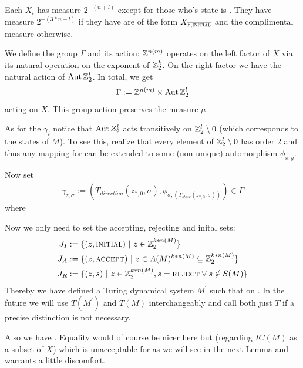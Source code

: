 \remark Each $X_i$ has measure $2^{-(n+l)}$ except for those who's state is \INI. They have measure $2^{-(3*n+l)}$ if they have are of the form $X_{\overline{z,\text{\scshape{initial}}}}$ and the complimental measure otherwise.

We define the group $\Gamma$ and its action:
$\mathbb{Z}^{n(m)}$ operates on the left factor of $X$ via its natural operation on the exponent of $\mathbb{Z}_2^k$.
On the right factor we have the natural action of $\operatorname{Aut} \mathbb{Z}_2^l$.
In total, we get
\begin{align*}
	\Gamma := \mathbb{Z}^{n(m)} \times \operatorname{Aut} \mathbb{Z}_2^l
\end{align*}
acting on $X$.
This group action preserves the measure $\mu$.

As for the $\gamma_i$ notice that
$\operatorname{Aut} Z_2^l$ acts transitively on $\mathbb{Z}_2^l \setminus 0$ (which corresponds to the states of $M$).
To see this, realize that every element of $\mathbb{Z}_2^l \setminus 0$ has order $2$ and thus any mapping  for  can be extended to some (non-unique) automorphism $\phi_{x,y}$.

Now set
\begin{align*}
	\gamma_{z,\sigma} := (T_{direction}(z_{*,0},\sigma) , \phi_{\sigma,(T_{state}(z_{*,0},\sigma))}) \in \Gamma
\end{align*}
where 

Now we only need to set the accepting, rejecting and inital sets:
\begin{align*}
	J_I & := \{(\overline{z,\text{\scshape{initial}}}) ~\vert~ z \in \mathbb{Z}_2^{k * n(M)} \} \\
	J_A & := \{(z,\text{\scshape{accept}}) ~\vert~ z \in A(M)^{k * n(M)} \subseteq \mathbb{Z}_2^{k * n(M)} \} \\
	J_R & := \{(z,s) ~\vert~ z \in \mathbb{Z}_2^{k * n(M)} , s = \text{\scshape{reject}} \vee s \notin S(M) \} \\
\end{align*}
Thereby we have defined a Turing dynamical system $M^\prime$ such that  on .
In the future we will use $T(M^\prime)$ and $T(M)$ interchangeably and call both just $T$ if a precise distinction is not necessary.

Also we have .
Equality would of course be nicer here but (regarding $IC(M)$ as a subset of $X$)  which is unacceptable for  as we will see in the next Lemma and warrants a little discomfort.
